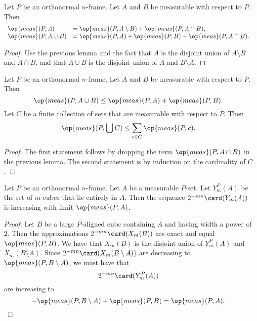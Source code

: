 \begin{lemma}
    Let $P$ be an orthonormal $n$-frame.  Let $A$ and $B$ be
    measurable with respect to $P$.  Then
        $$\begin{array}{lll}
        \op{meas}(P,A) &= \op{meas}(P,A\setminus B) + \op{meas}(P,A\cap
        B),\\
        \op{meas}(P,A\cup B) &= \op{meas}(P,A) + \op{meas}(P,B) - \op{meas}(P,A\cap B).
        \end{array}$$
\end{lemma}

\begin{proof} Use the previous lemma and the fact that $A$ is the disjoint
union of $A\setminus B$ and $A\cap B$, and that $A\cup B$ is the
disjoint union of $A$ and $B\setminus A$.
\end{proof}

\begin{lemma} Let $P$ be an orthonormal $n$-frame.
Let $A$ and $B$ be measurable with respect to $P$. Then
    $$\op{meas}(P,A\cup B) \le \op{meas}(P,A) + \op{meas}(P,B).$$
Let $C$ be a finite collection of sets that are measurable with
respect to $P$. Then
    $$\op{meas}(P,\bigcup C) \le \sum_{c\in C} \op{meas}(P,c).$$
\end{lemma}

\begin{proof}  The first statement follows by dropping the term
$\op{meas}(P,A\cap B)$ in the previous lemma.  The second statement
is by induction on the cardinality of $C$.
\end{proof}

\begin{lemma} Let $P$ be an orthonormal $n$-frame. Let $A$ be a measurable $P$-set.
Let $Y^P_m(A)$ be the set of $m$-cubes that lie entirely in $A$.
Then the sequence $2^{-m n}\card(Y_m(A))$ is increasing with limit
$\op{meas}(P,A)$.
\end{lemma}

\begin{proof} Let $B$ be a large $P$-aligned cube containing
$A$ and having width a power of $2$.  Then the approximations $2^{-m
n}\card(X_m(B))$ are exact and equal $\op{meas}(P,B)$.  We have that
$X_m(B)$ is the disjoint union of $Y^P_m(A)$ and $X_m(B\setminus
A)$.  Since $2^{-m n} \card(X_m(B\setminus A))$ are decreasing to
$\op{meas}(P,B\setminus A)$, we must have that
  $$2^{-m n}\card(Y^P_m(A))$$
are increasing to
    $$-\op{meas}(P,B\setminus A) + \op{meas}(P,B) =
    \op{meas}(P,A).$$
\end{proof}


